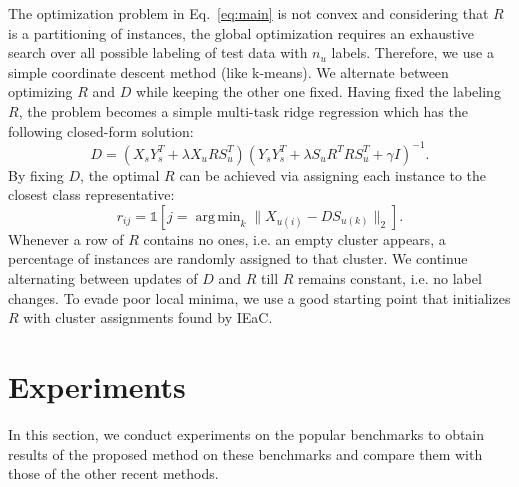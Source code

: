 \documentclass[10pt,twocolumn,letterpaper]{article}
\DeclareMathOperator*{\argmin}{arg\,min}
\begin{document}
The optimization problem in Eq.~\eqref{eq:main} is not convex and considering that $R$ is a partitioning of instances, the global optimization requires an
exhaustive search over all possible labeling of test data with $n_u$ labels. Therefore, we use a simple coordinate descent
method (like k-means). We alternate between optimizing $R$ and $D$ while keeping the other one fixed.
Having fixed the labeling $R$, the problem becomes a simple multi-task ridge regression which has the following closed-form solution:
\begin{equation} \label{eq:d_update}
  D = (X_s Y_s^T + \lambda X_u R S_u^T) (Y_s Y_s^T + \lambda S_u R^T R S_u^T  + \gamma I)^{-1}.
\end{equation}
By fixing $D$, the optimal $R$ can be achieved via assigning each instance to the closest class representative:
\begin{equation} \label{eq:r_update}
  r_{ij} = \mathds{1}[j = \argmin_{k} \lVert X_{u(i)} - D S_{u(k)} \rVert_2 ].
\end{equation}
Whenever a row of $R$ contains no ones, i.e. an empty cluster appears, a percentage of instances are randomly assigned to that cluster.
We continue alternating between updates of $D$ and $R$ till $R$ remains constant, i.e. no label changes.
To evade poor local minima, we use a good starting point that initializes $R$ with cluster assignments found by IEaC.
%
%
\section{Experiments} \label{experiments}
In this section, we conduct experiments on the popular benchmarks to obtain results of the proposed method on these benchmarks and compare them
 with those of the other recent methods.
\end{document}

